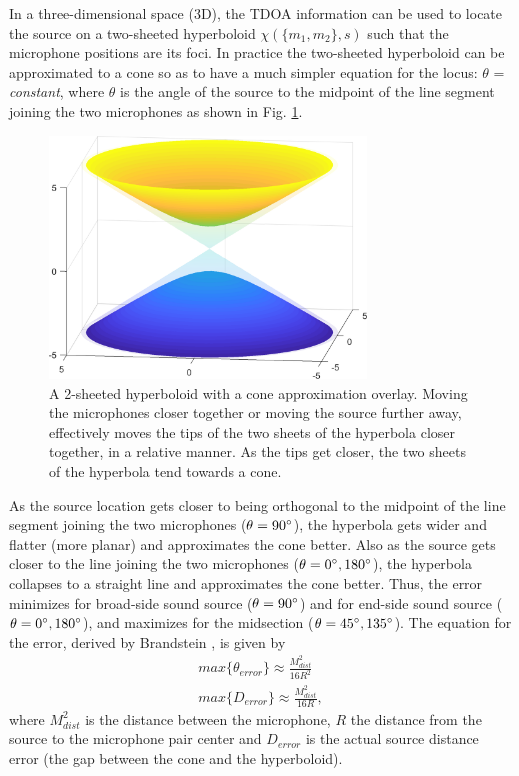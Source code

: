 In a three-dimensional space (3D), the TDOA information can be used to locate the source on a two-sheeted hyperboloid $\chi(\{m_{1},m_{2}\},s)$ such that the microphone positions are its foci. In practice the two-sheeted hyperboloid can be approximated to a cone so as to have a much simpler equation for the locus: $\theta$  = \textit{constant}, where $\theta$ is the angle of the source to the  midpoint of the line segment joining the two microphones as shown in Fig. \ref{fig:hyperboloid_Cone}.
\begin{figure}[H]
    \centering
    \includegraphics[width=0.75\textwidth]{Figures/hyperboloid.png}
    \caption{A 2-sheeted hyperboloid with a cone approximation overlay. Moving the microphones closer together or moving the source further away, effectively moves the tips of the two sheets of the hyperbola closer together, in a relative manner. As the tips get closer, the two sheets of the hyperbola tend towards a cone.}
    \label{fig:hyperboloid_Cone}
\end{figure}
As the source location gets closer to being orthogonal to the midpoint of the line segment joining the two microphones ($\theta=90\degree$), the hyperbola gets wider and flatter (more planar) and approximates the cone better. Also as the source gets closer to the line joining the two microphones ($\theta=0\degree, 180\degree$), the hyperbola collapses to a straight line and approximates the cone better. Thus, the error minimizes for broad-side sound source ($\theta=90\degree$) and for end-side sound source ($\theta=0\degree, 180\degree$), and maximizes for the midsection ($\theta=45\degree, 135\degree$). The equation for the error, derived by Brandstein \cite{Brandstein:1995:FSS:922154}, is given by
\begin{equation}
\begin{split}
    max\{\theta_{error}\} \approx  \frac{M_{dist}^2}{16R^2}\\
    max\{D_{error}\} \approx  \frac{M_{dist}^2}{16R},
\end{split}
\end{equation}
where $M_{dist}^2$ is the distance between the microphone, $R$ the distance from the source to the microphone pair center and $D_{error}$ is the actual source distance error (the gap between the cone and the hyperboloid).


